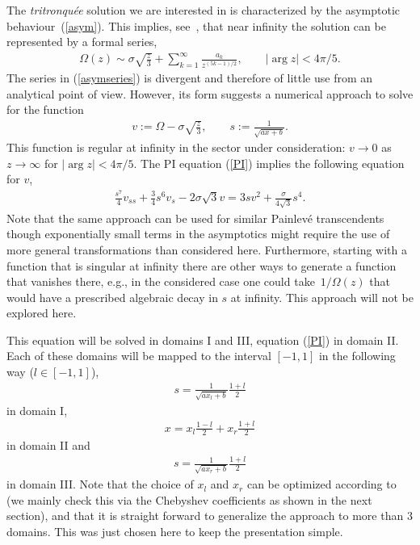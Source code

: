 \documentclass[pdftex]{sigma}
\begin{document}
The \emph{tritronqu\'ee} solution we are interested in is characterized by the asymptotic beha\-viour~(\ref{asym}). This implies, see~\cite{JK}, that near infinity the solution can be represented by a formal series,
\begin{gather}
 \Omega(z)\sim\sigma \sqrt{\frac{z}{3}}+\sum_{k=1}^{\infty}\frac{a_{k}}{z^{(5k-1)/2}}, \quad\quad |\arg z| < 4\pi/5. \label{asymseries}
\end{gather}
The series in (\ref{asymseries}) is divergent and therefore of little use from an analytical point of view. However, its form suggests a numerical approach to solve for the function
\begin{gather}
 v:=\Omega-\sigma\sqrt{\frac{z}{3}},\qquad s := \frac{1}{\sqrt{ax+b}}. \label{vs}
\end{gather}
This function is regular at infinity in the sector under consideration: $v \to 0$ as $z \to \infty$ for $|\arg z| < 4\pi/5$. The PI equation (\ref{PI}) implies the following equation for $v$,
\begin{gather}
 \frac{s^{7}}{4}v_{ss}+\frac{3}{4}s^{6}v_{s}-2\sigma\sqrt{3}v= 3sv^{2}+\frac{\sigma}{4\sqrt{3}}s^{4}. \label{veq}
\end{gather}
Note that the same approach can be used for similar Painlev\'e transcendents though exponentially small terms in the asymptotics might require the use of more general transformations than considered here. Furthermore, starting with a function that is singular at infinity there are other ways to generate a function that vanishes there, e.g., in the considered case one could take~$1/\Omega(z)$ that would have a prescribed algebraic decay in $s$ at infinity. This approach will not be explored here.

This equation will be solved in domains I and III, equation (\ref{PI}) in domain II. Each of these domains will be mapped to the interval $[-1,1]$ in the following way ($l\in[-1,1]$),
\begin{gather*}
 s = \frac{1}{\sqrt{ax_{l}+b}}\frac{1+l}{2} %
\end{gather*}
in domain I,
\begin{gather*}
 x = x_{l}\frac{1-l}{2}+x_{r}\frac{1+l}{2} %
\end{gather*}
in domain II and
\begin{gather*}
 s = \frac{1}{\sqrt{ax_{r}+b}}\frac{1+l}{2} %
\end{gather*}
in domain III. Note that the choice of $x_{l}$ and $x_{r}$ can be optimized according to \cite{DW} (we mainly check this via the Chebyshev coefficients as shown in the next section), and that it is straight forward to generalize the approach to more than 3 domains. This was just chosen here to keep the presentation simple.
\end{document}
